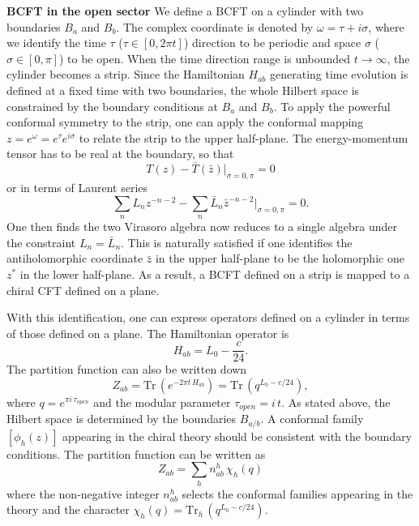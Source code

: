 \documentclass[submission, PhysLectNotes]{SciPost}
\begin{document}
{\bf BCFT in the open sector}
We define a BCFT on a cylinder with two boundaries $B_a$ and $B_b$. The complex coordinate is denoted by $\omega = \tau + i \sigma$, where we identify the time $\tau$ ($\tau \in [0,2\pi t]$) direction to be periodic and space $\sigma$ ($\sigma \in [0,\pi]$) to be open. When the time direction range is unbounded $t\rightarrow\infty$, the cylinder becomes a strip. Since the Hamiltonian $H_{ab}$ generating time evolution is defined at a fixed time with two boundaries, the whole Hilbert space is constrained by the boundary conditions at $B_a$ and $B_b$. To apply the powerful conformal symmetry to the strip, one can apply the conformal mapping $z = e^\omega = e^\tau e^{i\sigma}$ to relate the strip to the upper half-plane. The energy-momentum tensor has to be real at the boundary, so that
\begin{equation} \label{Eq_T_open}
    T(z) - \bar{T}(\bar{z})\vert_{\sigma=0,\pi} = 0
\end{equation}
or in terms of Laurent series 
\begin{equation}
    \sum_n L_n z^{-n-2} - \sum_n \bar{L}_n \bar{z}^{-n-2}\vert_{\sigma=0,\pi} = 0. 
\end{equation}
One then finds the two Virasoro algebra now reduces to a single algebra under the constraint $L_n = \bar{L}_n$. This is naturally satisfied if one identifies the antiholomorphic coordinate $\bar{z}$ in the upper half-plane to be the holomorphic one $z^*$ in the lower half-plane. As a result, a BCFT defined on a strip is mapped to a chiral CFT defined on a plane. 

With this identification, one can express operators defined on a cylinder in terms of those defined on a plane. The Hamiltonian operator is 
\begin{equation}
    H_{ab} = L_0 - \frac{c}{24}. 
\end{equation}
The partition function can also be written down 
\begin{equation}
    Z_{ab} = \mathrm{Tr}\,\left( e^{-2\pi t\, H_{ab}}\right) = \mathrm{Tr}\,\left( q^{L_0-c/24}\right),
\end{equation}
where $q=e^{\pi i\, \tau_{open}}$ and the modular parameter $\tau_{open} = i\,t$. As stated above, the Hilbert space is determined by the boundaries $B_{a/b}$. A conformal family $[\phi_{h}(z)]$ appearing in the chiral theory should be consistent with the boundary conditions. The partition function can be written as 
\begin{equation}
    Z_{ab} = \sum_h n_{ab}^h\, \chi_h(q)
\end{equation}
where the non-negative integer $n_{ab}^h$ selects the conformal families appearing in the theory and the character $\chi_h(q) = \mathrm{Tr}_h\,\left( q^{L_0-c/24}\right)$.
\end{document}

